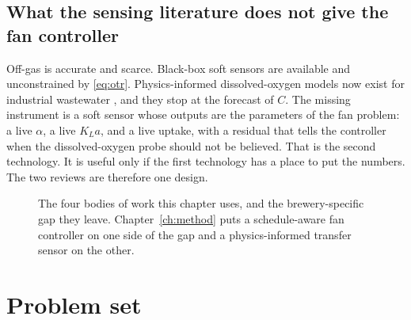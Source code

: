 \subsection{What the sensing literature does not give the fan controller}

Off-gas is accurate and scarce. Black-box soft sensors are available and unconstrained by \eqref{eq:otr}. Physics-informed dissolved-oxygen models now exist for industrial wastewater \cite{koksal2024}, and they stop at the forecast of $C$. The missing instrument is a soft sensor whose outputs are the parameters of the fan problem: a live $\alpha$, a live $K_La$, and a live uptake, with a residual that tells the controller when the dissolved-oxygen probe should not be believed. That is the second technology. It is useful only if the first technology has a place to put the numbers. The two reviews are therefore one design.

\begin{figure}[ht]
\centering
{}
\caption{The four bodies of work this chapter uses, and the brewery-specific gap they leave. Chapter~\ref{ch:method} puts a schedule-aware fan controller on one side of the gap and a physics-informed transfer sensor on the other.}
\label{fig:gap}
\end{figure}

\section{Problem set}
\label{sec:problem}

